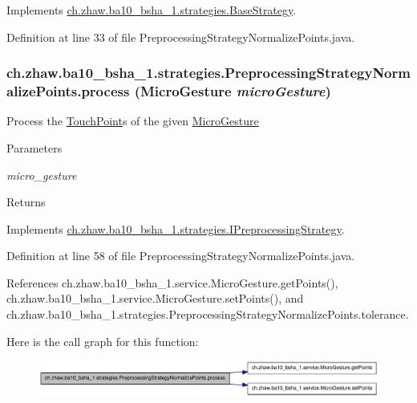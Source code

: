 Implements \hyperlink{classch_1_1zhaw_1_1ba10__bsha__1_1_1strategies_1_1BaseStrategy_a0496e8fd0099a5f0f7765322d7e752a9}{ch.zhaw.ba10\_\-bsha\_\-1.strategies.BaseStrategy}.

Definition at line 33 of file PreprocessingStrategyNormalizePoints.java.\hypertarget{classch_1_1zhaw_1_1ba10__bsha__1_1_1strategies_1_1PreprocessingStrategyNormalizePoints_a0b7ffa8b9a2f6d98a2b871fc4afa39f9}{
\subsubsection[{process}]{ ch.zhaw.ba10\_\-bsha\_\-1.strategies.PreprocessingStrategyNormalizePoints.process ({\bf MicroGesture} {\em microGesture})}}
\label{classch_1_1zhaw_1_1ba10__bsha__1_1_1strategies_1_1PreprocessingStrategyNormalizePoints_a0b7ffa8b9a2f6d98a2b871fc4afa39f9}
Process the \hyperlink{classch_1_1zhaw_1_1ba10__bsha__1_1_1TouchPoint}{TouchPoint}s of the given \hyperlink{}{MicroGesture}


\begin{DoxyParams}{Parameters}
\item[{\em micro\_\-gesture}]\end{DoxyParams}
\begin{DoxyReturn}{Returns}

\end{DoxyReturn}


Implements \hyperlink{interfacech_1_1zhaw_1_1ba10__bsha__1_1_1strategies_1_1IPreprocessingStrategy_a3e3885dce8fda7b79dc514078f11ad62}{ch.zhaw.ba10\_\-bsha\_\-1.strategies.IPreprocessingStrategy}.

Definition at line 58 of file PreprocessingStrategyNormalizePoints.java.

References ch.zhaw.ba10\_\-bsha\_\-1.service.MicroGesture.getPoints(), ch.zhaw.ba10\_\-bsha\_\-1.service.MicroGesture.setPoints(), and ch.zhaw.ba10\_\-bsha\_\-1.strategies.PreprocessingStrategyNormalizePoints.tolerance.

Here is the call graph for this function:\nopagebreak
\begin{figure}[H]
\begin{center}
\leavevmode
\includegraphics[width=351pt]{classch_1_1zhaw_1_1ba10__bsha__1_1_1strategies_1_1PreprocessingStrategyNormalizePoints_a0b7ffa8b9a2f6d98a2b871fc4afa39f9_cgraph}
\end{center}
\end{figure}


